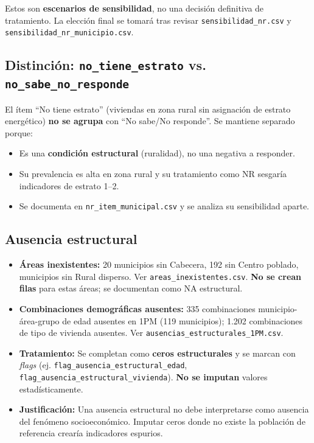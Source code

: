 Estos son \textbf{escenarios de sensibilidad}, no una decisión definitiva de tratamiento. La elección final se tomará tras revisar \texttt{sensibilidad\_nr.csv} y \texttt{sensibilidad\_nr\_municipio.csv}.

\subsection{Distinción: \texttt{no\_tiene\_estrato} vs. \texttt{no\_sabe\_no\_responde}}
\label{sec:estrato_nr}

El ítem ``No tiene estrato'' (viviendas en zona rural sin asignación de estrato energético) \textbf{no se agrupa} con ``No sabe/No responde''. Se mantiene separado porque:

\begin{itemize}
    \item Es una \textbf{condición estructural} (ruralidad), no una negativa a responder.
    \item Su prevalencia es alta en zona rural y su tratamiento como NR sesgaría indicadores de estrato 1--2.
    \item Se documenta en \texttt{nr\_item\_municipal.csv} y se analiza su sensibilidad aparte.
\end{itemize}

\subsection{Ausencia estructural}
\label{sec:ausencia_estructural}

\begin{itemize}
    \item \textbf{Áreas inexistentes:} 20 municipios sin Cabecera, 192 sin Centro poblado, municipios sin Rural disperso. Ver \texttt{areas\_inexistentes.csv}. \textbf{No se crean filas} para estas áreas; se documentan como NA estructural.
    \item \textbf{Combinaciones demográficas ausentes:} 335 combinaciones municipio-área-grupo de edad ausentes en 1PM (119 municipios); 1.202 combinaciones de tipo de vivienda ausentes. Ver \texttt{ausencias\_estructurales\_1PM.csv}.
    \item \textbf{Tratamiento:} Se completan como \textbf{ceros estructurales} y se marcan con \textit{flags} (ej. \texttt{flag\_ausencia\_estructural\_edad}, \texttt{flag\_ausencia\_estructural\_vivienda}). \textbf{No se imputan} valores estadísticamente.
    \item \textbf{Justificación:} Una ausencia estructural no debe interpretarse como ausencia del fenómeno socioeconómico. Imputar ceros donde no existe la población de referencia crearía indicadores espurios.
\end{itemize}

